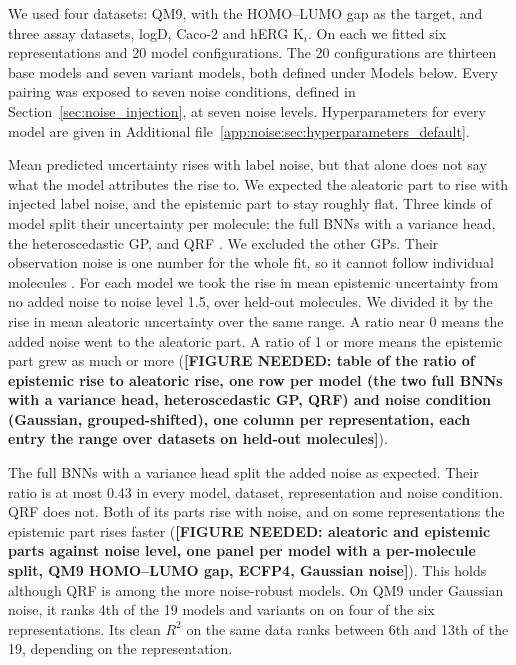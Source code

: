 We used four datasets: QM9, with the HOMO--LUMO gap as the target, and three assay datasets, logD, Caco-2 and hERG K$_i$. On each we fitted six representations and 20 model configurations. The 20 configurations are thirteen base models and seven variant models, both defined under Models below. Every pairing was exposed to seven noise conditions, defined in Section~\ref{sec:noise_injection}, at seven noise levels. Hyperparameters for every model are given in Additional file~\ref{app:noise:sec:hyperparameters_default}.

Mean predicted uncertainty rises with label noise, but that alone does not say what the model attributes the rise to. We expected the aleatoric part to rise with injected label noise, and the epistemic part to stay roughly flat. Three kinds of model split their uncertainty per molecule: the full BNNs with a variance head, the heteroscedastic GP, and QRF \citep{kendall2017, Rasmussen2005, Meinshausen2006}. We excluded the other GPs. Their observation noise is one number for the whole fit, so it cannot follow individual molecules \citep{Rasmussen2005}. For each model we took the rise in mean epistemic uncertainty from no added noise to noise level 1.5, over held-out molecules. We divided it by the rise in mean aleatoric uncertainty over the same range. A ratio near 0 means the added noise went to the aleatoric part. A ratio of 1 or more means the epistemic part grew as much or more (\textbf{[FIGURE NEEDED: table of the ratio of epistemic rise to aleatoric rise, one row per model (the two full BNNs with a variance head, heteroscedastic GP, QRF) and noise condition (Gaussian, grouped-shifted), one column per representation, each entry the range over datasets on held-out molecules]}).

The full BNNs with a variance head split the added noise as expected. Their ratio is at most 0.43 in every model, dataset, representation and noise condition. QRF does not. Both of its parts rise with noise, and on some representations the epistemic part rises faster (\textbf{[FIGURE NEEDED: aleatoric and epistemic parts against noise level, one panel per model with a per-molecule split, QM9 HOMO--LUMO gap, ECFP4, Gaussian noise]}). This holds although QRF is among the more noise-robust models. On QM9 under Gaussian noise, it ranks 4th of the 19 models and variants on \aucnorm on four of the six representations. Its clean $R^2$ on the same data ranks between 6th and 13th of the 19, depending on the representation.

